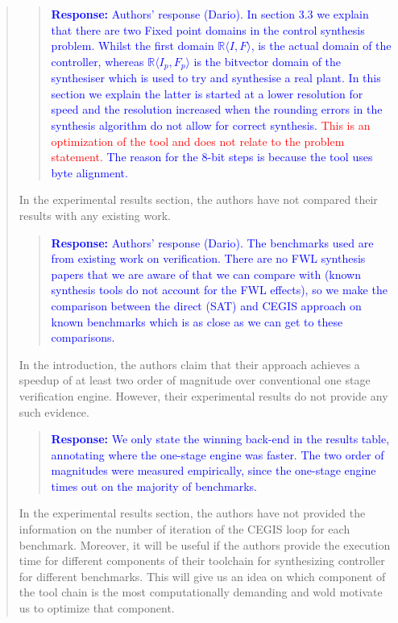 \documentclass[11pt]{article}
\begin{document}
\begin{quote}
\begin{quote}
\textcolor{blue}{\textbf{Response:} Authors' response (Dario).
In section 3.3 we explain that there are two Fixed point domains in the control synthesis problem. Whilst the first domain $\mathbb{R}\langle I,F \rangle$, is the actual domain of the controller, whereas $\mathbb{R}\langle I_p,F_p \rangle$ is the bitvector domain of the synthesiser which is used to try and synthesise a real plant. In this section we explain the latter is started at a lower resolution for speed and the resolution increased when the rounding errors in the synthesis algorithm do not allow for correct synthesis. \textcolor{red}{This is an optimization of the tool and does not relate to the problem statement.} The reason for the 8-bit steps is because the tool uses byte alignment.
}
\end{quote}

In the experimental results section, the authors have not compared their results with any existing work. 

\begin{quote}
\textcolor{blue}{\textbf{Response:} Authors' response (Dario).
The benchmarks used are from existing work on verification. There are no FWL synthesis papers that we are aware of that we can compare with (known synthesis tools do not account for the FWL effects), so we make the comparison between the direct (SAT) and CEGIS approach on known benchmarks which is as close as we can get to these comparisons. 
}
\end{quote}

In the introduction, the authors claim that their approach achieves a speedup of at least two order of magnitude over conventional one stage verification engine. However, their experimental results do not provide any such evidence.

\begin{quote}
\textcolor{blue}{\textbf{Response:} We only state the winning back-end in the
results table, annotating where the one-stage engine was faster. The two order
of magnitudes were measured empirically, since the one-stage engine times out
on the majority of benchmarks.}
\end{quote}

In the experimental results section, the authors have not provided the information on the number of iteration of the CEGIS loop for each benchmark. Moreover, it will be useful if the authors provide the execution time for different components of their toolchain for synthesizing controller for different benchmarks. This will give us an idea on which component of the tool chain is the most computationally demanding and wold motivate us to optimize that component.


\end{quote}
\end{document}
